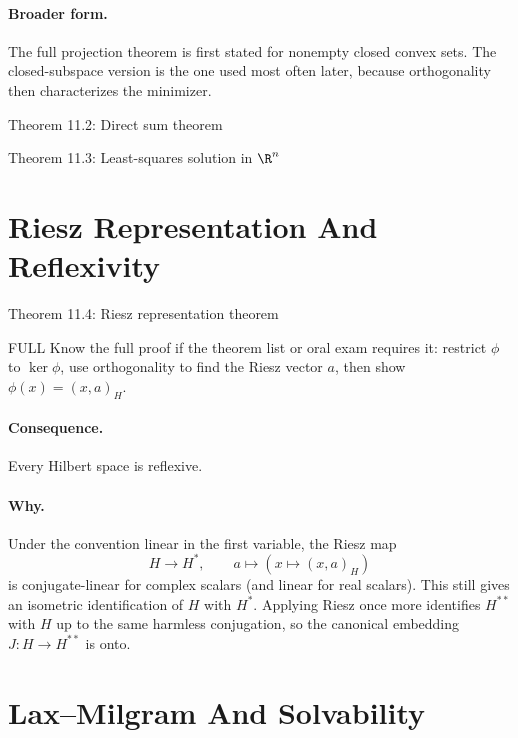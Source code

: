 \documentclass[header={Lecture 8 Exam Study Notes}]{study-note}
\begin{document}
\paragraph{Broader form.}
The full projection theorem is first stated for nonempty closed convex sets. The closed-subspace version is the one used most often later, because orthogonality then characterizes the minimizer.

\begin{thmbox}{Theorem 11.2: Direct sum theorem}
\thmDirectSum
\end{thmbox}

\begin{thmbox}{Theorem 11.3: Least-squares solution in $\R^n$}
\thmLeastSquares
\end{thmbox}

\section{Riesz Representation And Reflexivity}

\begin{thmbox}{Theorem 11.4: Riesz representation theorem}
\thmRieszRepresentation
\end{thmbox}

\begin{prooflevelbox}{FULL}
Know the full proof if the theorem list or oral exam requires it: restrict $\phi$ to $\ker\phi$, use orthogonality to find the Riesz vector $a$, then show $\phi(x)=(x,a)_H$.
\end{prooflevelbox}

\paragraph{Consequence.}
Every Hilbert space is reflexive.

\paragraph{Why.}
Under the convention linear in the first variable, the Riesz map
\[
H\to H^*,
\qquad
a\mapsto (x\mapsto (x,a)_H)
\]
is conjugate-linear for complex scalars (and linear for real scalars). This still gives an isometric identification of $H$ with $H^*$. Applying Riesz once more identifies $H^{**}$ with $H$ up to the same harmless conjugation, so the canonical embedding $J:H\to H^{**}$ is onto.

\section{Lax--Milgram And Solvability}
\end{document}
